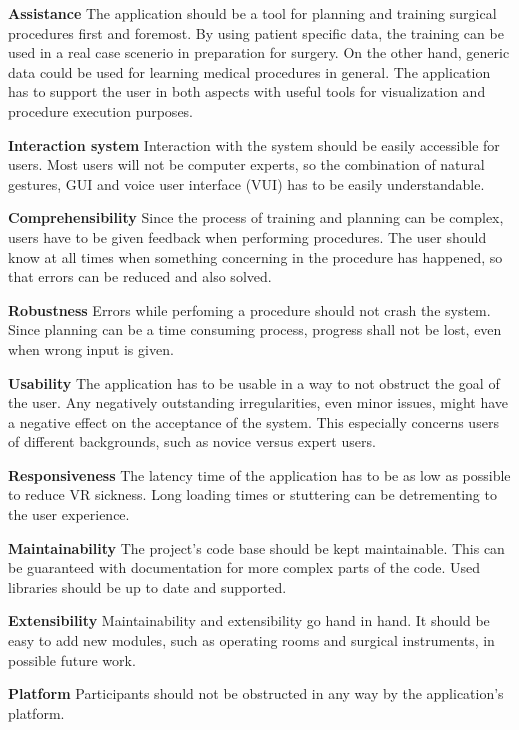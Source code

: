 \begin{compactenum}[label=(\Roman*)]
    \item \label{req::N1}\textbf{Assistance} The application should be a tool for planning and training surgical procedures first and foremost.
    By using patient specific data, the training can be used in a real case scenerio in preparation for surgery.
    On the other hand, generic data could be used for learning medical procedures in general.
    The application has to support the user in both aspects with useful tools for visualization and procedure execution purposes.
    \item \label{req::N2}\textbf{Interaction system} Interaction with the system should be easily accessible for users.
    Most users will not be computer experts, so the combination of natural gestures, GUI and voice user interface (VUI) has to be easily understandable.
    \item \label{req::N3}\textbf{Comprehensibility} Since the process of training and planning can be complex, users have to be given feedback when performing procedures.
    The user should know at all times when something concerning in the procedure has happened, so that errors can be reduced and also solved.
    \item \label{req::N4}\textbf{Robustness} Errors while perfoming a procedure should not crash the system.
    Since planning can be a time consuming process, progress shall not be lost, even when wrong input is given.
    \item \label{req::N5}\textbf{Usability} The application has to be usable in a way to not obstruct the goal of the user.
    Any negatively outstanding irregularities, even minor issues, might have a negative effect on the acceptance of the system.
    This especially concerns users of different backgrounds, such as novice versus expert users.
    \item \label{req::N6}\textbf{Responsiveness} The latency time of the application has to be as low as possible to reduce VR sickness.
    Long loading times or stuttering can be detrementing to the user experience.
    \item \label{req::N7}\textbf{Maintainability} The project’s code base should be kept maintainable.
    This can be guaranteed with documentation for more complex parts of the code.
    Used libraries should be up to date and supported.
    \item \label{req::N8}\textbf{Extensibility} Maintainability and extensibility go hand in hand.
    It should be easy to add new modules, such as operating rooms and surgical instruments, in possible future work.
    \item \label{req::N9}\textbf{Platform} Participants should not be obstructed in any way by the application’s platform.
\end{compactenum}